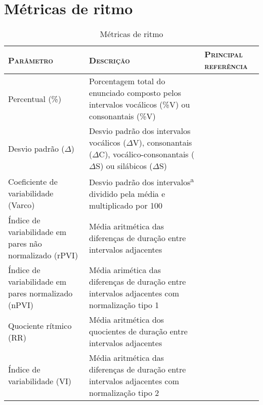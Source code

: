 
\pagebreak

\appendix
\section{Métricas de ritmo}

\begin{table}[h] 
	\label{metricas}	
	\caption{\normalsize Métricas de ritmo} 
	\vspace{1em}

		
\begin{tabular}{m{54mm} m{62mm} m{41.4mm}}
		
\scshape\normalsize Parâmetro & \scshape\normalsize Descrição &
\scshape\normalsize Principal referência \\

\hline
\hline

Percentual (\%) & Porcentagem total do enunciado composto pelos intervalos vocálicos (\%V) ou consonantais (\%V) & \cite{Ramus.etal1999} \\

\rowcolor{cinza1} Desvio padrão ($\Delta$) &  Desvio padrão dos intervalos vocálicos ($\Delta$V), consonantais ($\Delta$C), vocálico-consonantais ($\Delta$S) ou silábicos ($\Delta$S) & \cite{Ramus.etal1999}  \\

Coeficiente de variabilidade (Varco) &  Desvio padrão dos intervalos\textsuperscript{a} dividido pela média e multiplicado por 100 & \cite{Dellwo2006}\\

\rowcolor{cinza1} Índice de variabilidade em pares não normalizado (rPVI) & Média aritmética das diferenças de duração entre intervalos adjacentes & \cite{Low.etal2000} \\

Índice de variabilidade em pares normalizado (nPVI) & Média arimética das diferenças de duração entre intervalos adjacentes com normalização tipo 1 & \cite{Low.etal2000} \\

\rowcolor{cinza1} Quociente rítmico (RR)  & Média aritmética dos quocientes de duração entre intervalos adjacentes & \cite{Gibbon.Gut2001}  \\

Índice de variabilidade (VI)  &  Média aritmética das diferenças de duração entre intervalos adjacentes com normalização tipo 2 & \cite{Deterding1994, Deterding2001} \\


\end{tabular}
\end{table}
